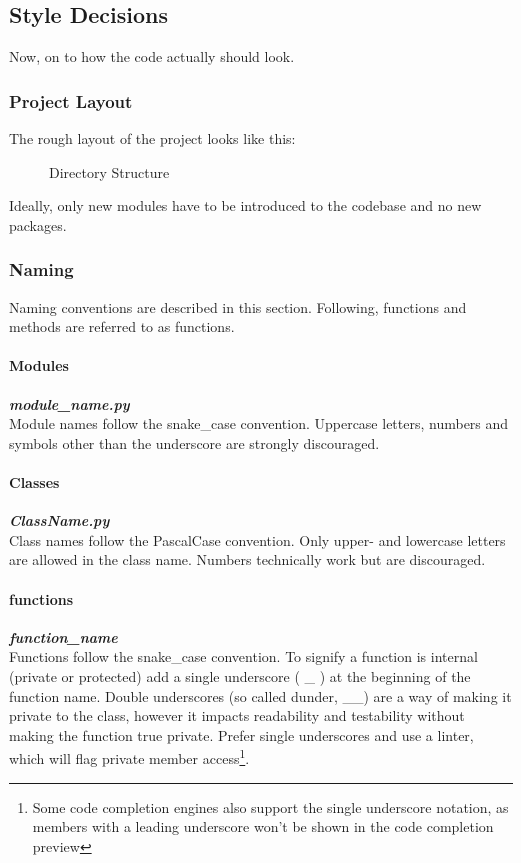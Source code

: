 \subsection{Style Decisions}\label{sub:descitions}
Now, on to how the code actually should look.

\subsubsection{Project Layout}
The rough layout of the project looks like this: 

\begin{figure}[!ht]
    \caption{Directory Structure}
\end{figure}

Ideally, only new modules have to be introduced to the codebase and no new
packages.

\newpage

\subsubsection{Naming}
Naming conventions are described in this section. Following, functions and
methods are referred to as functions. 

\paragraph{Modules} \textbf{\textit{module\_name.py}} \\
Module names follow the snake\_case convention. Uppercase letters, numbers and
symbols other than the underscore are strongly discouraged.

\paragraph{Classes} \textbf{\textit{ClassName.py}}  \\
Class names follow the PascalCase convention. Only upper- and lowercase letters
are allowed in the class name. Numbers technically work but are discouraged.

\paragraph{functions} \textbf{\textit{function\_name}} \\
Functions follow the snake\_case convention. To signify a function is internal
(private or protected) add a single underscore ( \_ ) at the beginning of the
function name. Double underscores (so called {\glqq dunder\grqq}, \_\_) are a
way of making it private to the class, however it impacts readability and
testability without making the function {\glqq true private\grqq}. Prefer
single underscores and use a linter, which will flag private member
access\footnote{Some code completion engines also support the single underscore
notation, as members with a leading underscore won't be shown in the code
completion preview}.

